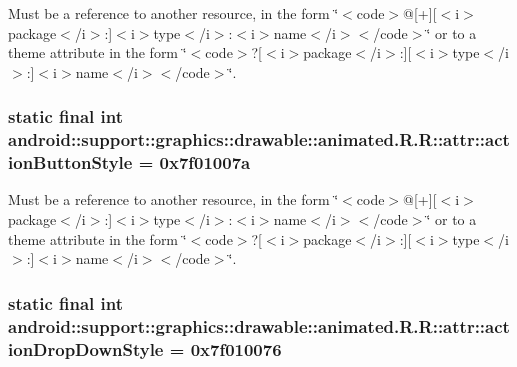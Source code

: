 Must be a reference to another resource, in the form \char`\"{}$<$code$>$@\mbox{[}+\mbox{]}\mbox{[}$<$i$>$package$<$/i$>$:\mbox{]}$<$i$>$type$<$/i$>$:$<$i$>$name$<$/i$>$$<$/code$>$\char`\"{} or to a theme attribute in the form \char`\"{}$<$code$>$?\mbox{[}$<$i$>$package$<$/i$>$:\mbox{]}\mbox{[}$<$i$>$type$<$/i$>$:\mbox{]}$<$i$>$name$<$/i$>$$<$/code$>$\char`\"{}. \hypertarget{classandroid_1_1support_1_1graphics_1_1drawable_1_1animated_1_1_r_1_1attr_7968ce287335e8d9b72e8daaa40e6f08}{
\subsubsection[{actionButtonStyle}]{\setlength{\rightskip}{0pt plus 5cm}static final int android::support::graphics::drawable::animated.R.R::attr::actionButtonStyle = 0x7f01007a}}
\label{classandroid_1_1support_1_1graphics_1_1drawable_1_1animated_1_1_r_1_1attr_7968ce287335e8d9b72e8daaa40e6f08}


Must be a reference to another resource, in the form \char`\"{}$<$code$>$@\mbox{[}+\mbox{]}\mbox{[}$<$i$>$package$<$/i$>$:\mbox{]}$<$i$>$type$<$/i$>$:$<$i$>$name$<$/i$>$$<$/code$>$\char`\"{} or to a theme attribute in the form \char`\"{}$<$code$>$?\mbox{[}$<$i$>$package$<$/i$>$:\mbox{]}\mbox{[}$<$i$>$type$<$/i$>$:\mbox{]}$<$i$>$name$<$/i$>$$<$/code$>$\char`\"{}. \hypertarget{classandroid_1_1support_1_1graphics_1_1drawable_1_1animated_1_1_r_1_1attr_8be6b3ea70e85b4ac9b07da29482abe2}{
\subsubsection[{actionDropDownStyle}]{\setlength{\rightskip}{0pt plus 5cm}static final int android::support::graphics::drawable::animated.R.R::attr::actionDropDownStyle = 0x7f010076}}
\label{classandroid_1_1support_1_1graphics_1_1drawable_1_1animated_1_1_r_1_1attr_8be6b3ea70e85b4ac9b07da29482abe2}


